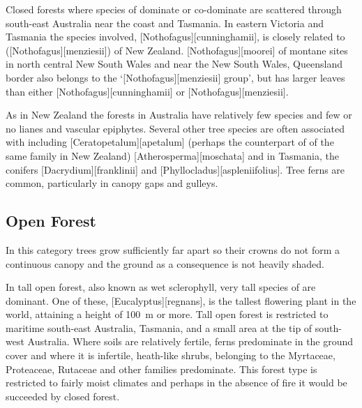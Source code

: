 Closed forests where species of  dominate or co-dominate are scattered through south-east Australia near the coast and Tasmania.
In eastern Victoria and Tasmania the species involved, [Nothofagus][cunninghamii], is closely related to  ([Nothofagus][menziesii]) of New Zealand.
[Nothofagus][moorei] of montane sites in north central New South Wales and near the New South Wales, Queensland border also belongs to the `[Nothofagus][menziesii] group', but has larger leaves than either [Nothofagus][cunninghamii] or [Nothofagus][menziesii].

As in New Zealand the  forests in Australia have relatively few species and few or no lianes and vascular epiphytes.
Several other tree species are often associated with  including [Ceratopetalum][apetalum] (perhaps the counterpart of  of the same family in New Zealand) [Atherosperma][moschata] and in Tasmania, the conifers [Dacrydium][franklinii] and [Phyllocladus][aspleniifolius].
Tree ferns are common, particularly in canopy gaps and gulleys.

\subsection{Open Forest}

In this category trees grow sufficiently far apart so their crowns do not form a continuous canopy and the ground as a consequence is not heavily shaded.

In tall open forest, also known as wet sclerophyll, very tall species of  are dominant.
One of these, [Eucalyptus][regnans], is the tallest flowering plant in the world, attaining a height of \SI{100}{\metre} or more.
Tall open forest is restricted to maritime south-east Australia, Tasmania, and a small area at the tip of south-west Australia.
Where soils are relatively fertile, ferns predominate in the ground cover and where it is infertile, heath-like shrubs, belonging to the Myrtaceae, Proteaceae, Rutaceae and other families predominate.
This forest type is restricted to fairly moist climates and perhaps in the absence of fire it would be succeeded by closed forest.

